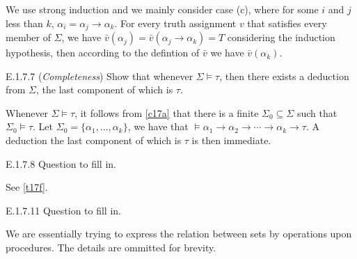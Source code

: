 We use strong induction and we mainly consider case (c), where for some $i$ and $j$ less than $k$, $\alpha_i=\alpha_j\rightarrow \alpha_k$. For every truth assignment $v$ that satisfies every member of $\Sigma$, we have $\bar{v}(\alpha_j)=\bar{v}(\alpha_j\rightarrow \alpha_k)=T$ considering the induction hypothesis, then according to the defintion of $\bar{v}$ we have $\bar{v}(\alpha_k)$.

\begin{exercise}{E.1.7.7}
  (\textit{Completeness}) Show that whenever $\Sigma\vDash \tau$, then there exists a deduction from $\Sigma$, the last component of which is $\tau$.
\end{exercise}

Whenever $\Sigma\vDash\tau$, it follows from \ref{c17a} that there is a finite $\Sigma_0\subseteq \Sigma$ such that $\Sigma_0\vDash\tau$. Let $\Sigma_0=\{\alpha_1,\dots,\alpha_k\}$, we have that $\vDash \alpha_1\rightarrow \alpha_2\rightarrow\cdots\rightarrow \alpha_k\rightarrow\tau$.  A deduction the last component of which is $\tau$ is then immediate.

\begin{exercise}{E.1.7.8}
  Question to fill in.
\end{exercise}

See \ref{t17f}.

\setcounter{exercise}{10}

\begin{exercise}{E.1.7.11}
  Question to fill in.
\end{exercise}

We are essentially trying to express the relation between sets by operations upon procedures. The details are ommitted for brevity.

